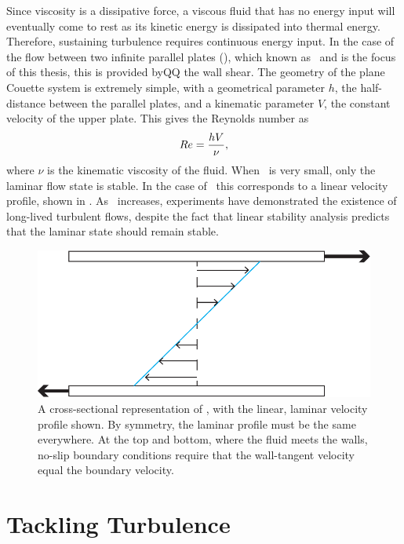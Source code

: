 Since viscosity is a dissipative force, a viscous fluid that has no energy input will eventually come to rest as its kinetic energy is dissipated into thermal energy. Therefore, sustaining turbulence requires continuous energy input. In the case of the flow between two infinite parallel plates (), which known as \pCf\ and is the focus of this thesis, this is provided byQQ the wall shear. The geometry of the plane Couette system is extremely simple, with a geometrical parameter $h$, the half-distance between the parallel plates, and a kinematic parameter $V$, the constant velocity of the upper plate. This gives the Reynolds number as 
\begin{equation}
Re = \dfrac{hV}{\nu},
\end{equation}
where $\nu$ is the kinematic viscosity of the fluid. When \ReN~is very small, only the laminar flow state is stable. In the case of \pCf\ this corresponds to a linear velocity profile, shown in . As \ReN~increases, experiments have demonstrated the existence of long-lived turbulent flows, despite the fact that linear stability analysis predicts that the laminar state should remain stable.
\begin{figure}
\centerline{
\includegraphics[scale=0.6]{Figs/planeCouetteMeanFlow}}
\caption{A cross-sectional representation of \pCf, with the linear, laminar velocity profile shown. By symmetry, the laminar profile must be the same everywhere. At the top and bottom, where the fluid meets the walls, no-slip boundary conditions require that the wall-tangent velocity equal the boundary velocity.}\label{fig:planeCouetteBulk}
\end{figure}

\section{Tackling Turbulence} 

